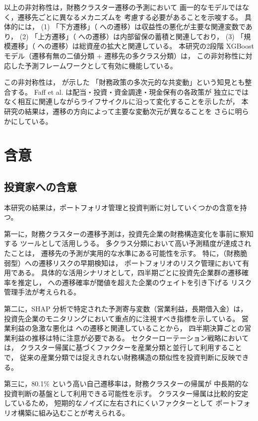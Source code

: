 以上の非対称性は，財務クラスター遷移の予測において
画一的なモデルではなく，遷移先ごとに異なるメカニズムを
考慮する必要があることを示唆する。
具体的には，
(1) 「下方遷移」（ への遷移）は収益性の悪化が主要な関連変数であり，
(2) 「上方遷移」（ への遷移）は内部留保の蓄積と関連しており，
(3) 「規模遷移」（ への遷移）は総資産の拡大と関連している。
本研究の2段階 XGBoost モデル（遷移有無の二値分類 + 遷移先の多クラス分類）は，
この非対称性に対応した予測フレームワークとして有効に機能している。

この非対称性は， が示した
「財務政策の多次元的な共変動」という知見とも整合する。
Faff et al. は配当・投資・資金調達・現金保有の各政策が
独立にではなく相互に関連しながらライフサイクルに沿って変化することを示したが，
本研究の結果は，遷移の方向によって主要な変動次元が異なることを
さらに明らかにしている。

\section{含意}
\label{sec:disc-implications}

\subsection{投資家への含意}

本研究の結果は，ポートフォリオ管理と投資判断に対していくつかの含意を持つ。

第一に，財務クラスターの遷移予測は，投資先企業の財務構造変化を事前に察知する
ツールとして活用しうる。
多クラス分類において高い予測精度が達成されたことは，
遷移先の予測が実用的な水準にある可能性を示す。
特に，（財務脆弱型）への遷移リスクの早期検知は，
ポートフォリオのリスク管理において有用である。
具体的な活用シナリオとして，四半期ごとに投資先企業群の遷移確率を推定し，
 への遷移確率が閾値を超えた企業のウェイトを引き下げる
リスク管理手法が考えられる。

第二に，SHAP 分析で特定された予測寄与変数（営業利益，長期借入金）は，
投資先企業のモニタリングにおいて重点的に注視すべき指標を示している。
営業利益の急激な悪化は  への遷移と関連していることから，
四半期決算ごとの営業利益の推移は特に注意が必要である。
セクターローテーション戦略においては，
クラスター帰属に基づくファクターを産業分類と並行して利用することで，
従来の産業分類では捉えきれない財務構造の類似性を投資判断に反映できる。

第三に，80.1\% という高い自己遷移率は，財務クラスターの帰属が
中長期的な投資判断の基盤として利用できる可能性を示す。
クラスター帰属は比較的安定しているため，
短期的なノイズに左右されにくいファクターとして
ポートフォリオ構築に組み込むことが考えられる。

